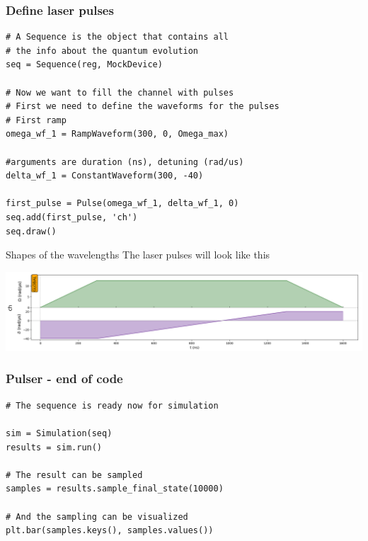 \begin{frame}[fragile]
\frametitle{Define laser pulses}
\begin{small}
\begin{verbatim}
# A Sequence is the object that contains all
# the info about the quantum evolution
seq = Sequence(reg, MockDevice)

# Now we want to fill the channel with pulses 
# First we need to define the waveforms for the pulses
# First ramp
omega_wf_1 = RampWaveform(300, 0, Omega_max) 

#arguments are duration (ns), detuning (rad/us)
delta_wf_1 = ConstantWaveform(300, -40) 

first_pulse = Pulse(omega_wf_1, delta_wf_1, 0)
seq.add(first_pulse, 'ch')
seq.draw()
\end{verbatim}
\end{small}
\end{frame}

\begin{frame}{Shapes of the wavelengths}
The laser pulses will look like this
\begin{center}
\includegraphics[scale=0.30]{images/seq1.png}
\end{center}
\end{frame}

\begin{frame}[fragile]
\frametitle{Pulser - end of code}
\begin{verbatim}
# The sequence is ready now for simulation

sim = Simulation(seq)
results = sim.run()

# The result can be sampled
samples = results.sample_final_state(10000)

# And the sampling can be visualized
plt.bar(samples.keys(), samples.values())
\end{verbatim}
\end{frame}

